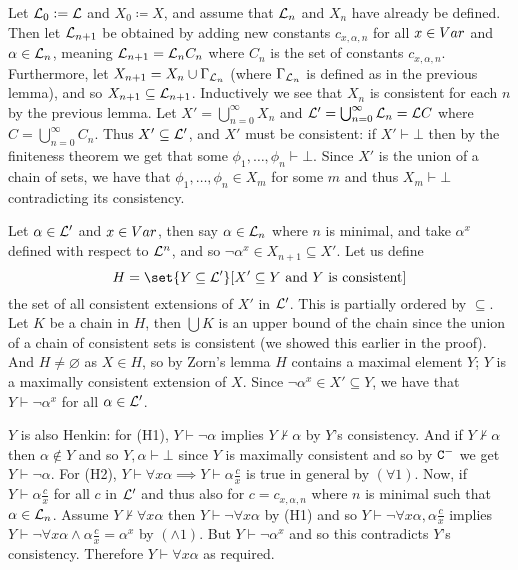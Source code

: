 Let ${\cal L}_0\coloneqq{\cal L}$ and $X_0\coloneqq X$, and assume that ${\cal L}_n$ and $X_n$ have already be defined.
Then let ${\cal L}_{n+1}$ be obtained by adding new constants $c_{x,\alpha,n}$ for all $x\in\Var$ and $\alpha\in{\cal L}_n$, meaning ${\cal L}_{n+1}={\cal L}_nC_n$ where $C_n$ is the set of constants
$c_{x,\alpha,n}$.
Furthermore, let $X_{n+1}=X_n\cup\Gamma_{{\cal L}_n}$ (where $\Gamma_{{\cal L}_n}$ is defined as in the previous lemma), and so $X_{n+1}\subseteq{\cal L}_{n+1}$.
Inductively we see that $X_n$ is consistent for each $n$ by the previous lemma.
Let $X'=\bigcup_{n=0}^\infty X_n$ and ${\cal L}'=\bigcup_{n=0}^\infty{\cal L}_n={\cal L}C$ where $C=\bigcup_{n=0}^\infty C_n$.
Thus $X'\subseteq{\cal L}'$, and $X'$ must be consistent: if $X'\vdash\bot$ then by the finiteness theorem we get that some $\phi_1,\dots,\phi_n\vdash\bot$.
Since $X'$ is the union of a chain of sets, we have that $\phi_1,\dots,\phi_n\in X_m$ for some $m$ and thus $X_m\vdash\bot$ contradicting its consistency.

Let $\alpha\in{\cal L}'$ and $x\in\Var$, then say $\alpha\in{\cal L}_n$ where $n$ is minimal, and take $\alpha^x$ defined with respect to ${\cal L}^n$, and so $\neg\alpha^x\in X_{n+1}\subseteq X'$.
Let us define
$$ H = \set{Y\subseteq{\cal L'}}[X'\subseteq Y\hbox{ and $Y$ is consistent}] $$
the set of all consistent extensions of $X'$ in ${\cal L'}$.
This is partially ordered by $\subseteq$.
Let $K$ be a chain in $H$, then $\bigcup K$ is an upper bound of the chain since the union of a chain of consistent sets is consistent (we showed this earlier in the proof).
And $H\neq\varnothing$ as $X\in H$, so by Zorn's lemma $H$ contains a maximal element $Y$; $Y$ is a maximally consistent extension of $X$.
Since $\neg\alpha^x\in X'\subseteq Y$, we have that $Y\vdash\neg\alpha^x$ for all $\alpha\in{\cal L}'$.

$Y$ is also Henkin: for (H1), $Y\vdash\neg\alpha$ implies $Y\nvdash\alpha$ by $Y$'s consistency.
And if $Y\nvdash\alpha$ then $\alpha\notin Y$ and so $Y,\alpha\vdash\bot$ since $Y$ is maximally consistent and so by ${\tt C}^-$ we get $Y\vdash\neg\alpha$.
For (H2), $Y\vdash\forall x\alpha\implies Y\vdash\alpha\frac cx$ is true in general by $(\forall1)$.
Now, if $Y\vdash\alpha\frac cx$ for all $c$ in ${\cal L'}$ and thus also for $c=c_{x,\alpha,n}$ where $n$ is minimal such that $\alpha\in{\cal L}_n$.
Assume $Y\nvdash\forall x\alpha$ then $Y\vdash\neg\forall x\alpha$ by (H1) and so $Y\vdash\neg\forall x\alpha,\alpha\frac cx$ implies $Y\vdash\neg\forall x\alpha\land\alpha\frac cx=\alpha^x$ by $(\land1)$.
But $Y\vdash\neg\alpha^x$ and so this contradicts $Y$'s consistency.
Therefore $Y\vdash\forall x\alpha$ as required.

